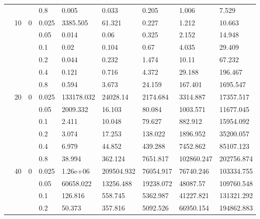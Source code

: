 \begin{longtable}{|l|l|l|l|l|l|l|l|l|}
\cmidrule{4-9} &     &          & 0.8            & 0.005      & 0.033      & 0.205      & 1.006      & 7.529      \\
\cmidrule{2-9} & 10  & 0        & 0.025          & 3385.505   & 61.321     & 0.227      & 1.212      & 10.663     \\
\cmidrule{4-9} &     &          & 0.05           & 0.014      & 0.06       & 0.325      & 2.152      & 14.948     \\
\cmidrule{4-9} &     &          & 0.1            & 0.02       & 0.104      & 0.67       & 4.035      & 29.409     \\
\cmidrule{4-9} &     &          & 0.2            & 0.044      & 0.232      & 1.474      & 10.11      & 67.232     \\
\cmidrule{4-9} &     &          & 0.4            & 0.121      & 0.716      & 4.372      & 29.188     & 196.467    \\
\cmidrule{4-9} &     &          & 0.8            & 0.594      & 3.673      & 24.159     & 167.401    & 1695.547   \\
\cmidrule{2-9} & 20  & 0        & 0.025          & 133178.032 & 24028.14   & 2174.684   & 3314.887   & 17357.517  \\
\cmidrule{4-9} &     &          & 0.05           & 2009.332   & 16.103     & 80.084     & 1003.571   & 11677.045  \\
\cmidrule{4-9} &     &          & 0.1            & 2.411      & 10.048     & 79.627     & 882.912    & 15954.092  \\
\cmidrule{4-9} &     &          & 0.2            & 3.074      & 17.253     & 138.022    & 1896.952   & 35200.057  \\
\cmidrule{4-9} &     &          & 0.4            & 6.979      & 44.852     & 439.288    & 7452.862   & 85107.123  \\
\cmidrule{4-9} &     &          & 0.8            & 38.994     & 362.124    & 7651.817   & 102860.247 & 202756.874 \\
\cmidrule{2-9} & 40  & 0        & 0.025          & 1.26e+06   & 209504.932 & 76054.917  & 76740.246  & 103334.755 \\
\cmidrule{4-9} &     &          & 0.05           & 60658.022  & 13256.488  & 19238.072  & 48087.57   & 109760.548 \\
\cmidrule{4-9} &     &          & 0.1            & 126.816    & 558.745    & 5362.987   & 41227.821  & 131321.292 \\
\cmidrule{4-9} &     &          & 0.2            & 50.373     & 357.816    & 5092.526   & 66950.154  & 194862.883 \\

\end{longtable}
